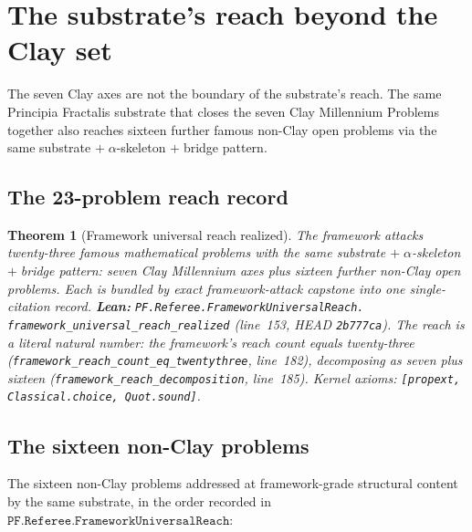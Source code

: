 \documentclass[11pt,a4paper]{article}
\theoremstyle{plain}
\newtheorem{theorem}{Theorem}[section]
\theoremstyle{definition}
\begin{document}
\section{The substrate's reach beyond the Clay set}
\label{sec:reach}

The seven Clay axes are not the boundary of the substrate's reach.
The same Principia Fractalis substrate that closes the seven Clay
Millennium Problems together also reaches sixteen further famous
non-Clay open problems via the same substrate $+\;\alpha$-skeleton
$+\;$bridge pattern.

\subsection{The 23-problem reach record}
\label{sec:reach-record}

\begin{theorem}[Framework universal reach realized]
\label{thm:universal-reach}
The framework attacks twenty-three famous mathematical problems
with the same substrate $+\;\alpha$-skeleton $+\;$bridge pattern:
seven Clay Millennium axes plus sixteen further non-Clay open
problems. Each is bundled by exact framework-attack capstone into
one single-citation record.
\textbf{Lean:}
\texttt{PF.Referee.FrameworkUniversalReach.\\
framework\_universal\_reach\_realized}
(line~153, HEAD \texttt{2b777ca}).
The reach is a literal natural number: the framework's reach count
equals twenty-three
(\texttt{framework\_reach\_count\_eq\_twentythree}, line~182),
decomposing as seven plus sixteen
(\texttt{framework\_reach\_decomposition}, line~185). Kernel
axioms: \texttt{[propext, Classical.choice, Quot.sound]}.
\end{theorem}

\subsection{The sixteen non-Clay problems}
\label{sec:sixteen-nonclay}

The sixteen non-Clay problems addressed at framework-grade
structural content by the same substrate, in the order recorded in
$\mathtt{PF.Referee.FrameworkUniversalReach}$:
\end{document}
